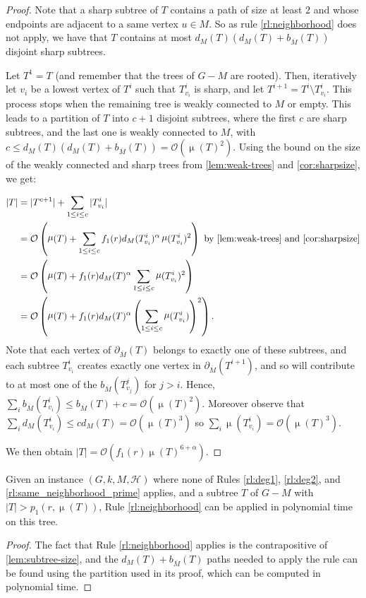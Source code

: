 \documentclass{amsart}
\newcommand{\pom}{\partial_{\overline{M}}}
\newcommand{\bom}{b_{\overline{M}}}
\newcommand{\mH}{\mathcal{H}}
\DeclareMathOperator\db{\mu}
\newcommand{\ruleref}[1]{\hyperref[#1]{\ref*{#1}}}
\renewcommand{\O}{\mathcal{O}}
\begin{document}
\begin{proof}
Note that a sharp subtree of $T$ contains a path of size at least $2$ and whose endpoints are adjacent to a same vertex $u\in M$. So as rule \ruleref{rl:neighborhood} does not apply, we have that $T$ contains at most $d_M(T)(d_M(T)+\bom(T))$ disjoint sharp subtrees.

Let $T^1=T$ (and remember that the trees of $G-M$ are rooted).
Then, iteratively let $v_i$ be a lowest vertex of $T^i$ such that $T^i_{v_i}$ is sharp, and let $T^{i+1} = T^i \setminus T^i_{v_i}$.
This process stops when the remaining tree is weakly connected to $M$ or empty. This leads to a partition of $T$ into $c+1$ disjoint subtrees, where the first $c$ are sharp subtrees, and the last one is weakly connected to $M$, with $c\le d_M(T)(d_M(T)+\bom(T))=\O(\db(T)^2)$.  Using the bound on the size of the weakly connected and sharp trees from \autoref{lem:weak-trees} and \autoref{cor:sharpsize}, we get:


\begin{align*}
    |T| &= |T^{c+1}| + \sum_{1\le i\le c} |T^i_{v_i}|\\
           &= \O\left(\db(T)+\sum_{1\le i\le c} f_1(r) d_M(T^i_{v_i})^\alpha\db(T^i_{v_i})^2\right) ~ \text{by \autoref{lem:weak-trees} and \autoref{cor:sharpsize}}\\
           &= \O\left(\db(T)+f_1(r) d_M(T)^\alpha\sum_{1\le i\le c} \db(T^i_{v_i})^2\right)\\
           &= \O\left(\db(T)+f_1(r) d_M(T)^\alpha \left(\sum_{1\le i\le c} \db(T^i_{v_i})\right)^2 \right).
\end{align*}
Note that each vertex of $\pom(T)$ belongs to exactly one of these subtrees, and each subtree $T^i_{v_i}$ creates exactly one vertex in $\pom(T^{i+1})$, and so will contribute to at most one of the $\bom(T^j_{v_j})$ for $j>i$. Hence, $\sum_i \bom(T^i_{v_i}) \le \bom(T) + c =\O(\db(T)^2)$. 
Moreover observe that $\sum_i d_M(T^i_{v_i}) \le c d_M(T) = \O(\db(T)^3)$ so $\sum_i \db(T^i_{v_i})=\O(\db(T)^3)$.

We then obtain $|T|=\O(f_1(r) \db(T)^{6+\alpha})$.
\end{proof}

\begin{corollary}\label{lm:boundSzT}
    Given an instance $(G,k, M, \mH)$ where none of Rules \ruleref{rl:deg1}, \ruleref{rl:deg2}, and \ruleref{rl:same_neighborhood_prime} applies, and a subtree $T$ of $G-M$ with $|T|> p_1(r,\db(T))$, Rule \ruleref{rl:neighborhood} can be applied in polynomial time on this tree.
\end{corollary}
\begin{proof}
    The fact that  Rule \ruleref{rl:neighborhood} applies is the contrapositive of \autoref{lem:subtree-size}, and the $d_M(T)+\bom(T)$ paths needed to apply the rule can be found using the partition used in its proof, which can be computed in polynomial time.
\end{proof}
\end{document}
